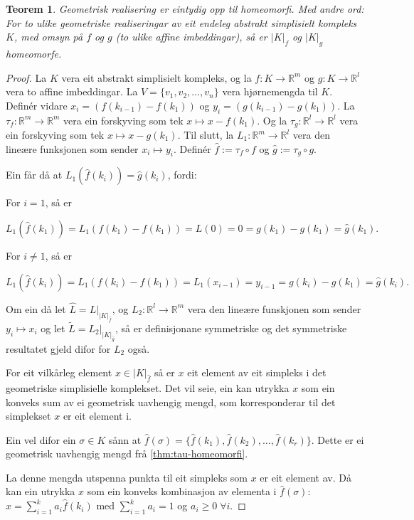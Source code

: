 \documentclass[a4paper, 12pt, norsk]{article}
\theoremstyle{plain}
\newtheorem{theorem}{Teorem}[section]
\theoremstyle{definition}
\newcommand{\Rb}{\mathbb{R}}
\newcommand{\gr}[1]{ \lvert #1 \rvert } %
\begin{document}
\begin{theorem} \label{thm:gr-eintydig} %
	Geometrisk realisering er eintydig opp til homeomorfi. Med andre ord: For to ulike geometriske realiseringar av eit endeleg abstrakt simplisielt kompleks $K$, med omsyn på $f$ og $g$ (to ulike affine imbeddingar), så er $\gr{K}_f$ og $\gr{K}_g$ homeomorfe.
\end{theorem}

\begin{proof}
	La $K$ vera eit abstrakt simplisielt kompleks, og la $f:K\to\Rb^m$ og $g:K\to\Rb^l$ vera to affine imbeddingar. La $V=\{ v_1, v_2, \dots, v_n \}$ vera hjørnemengda til $K$. Definér vidare $x_i=(f(k_{i-1})-f(k_1))$ og $y_i=(g(k_{i-1})-g(k_1))$. La $\tau_f:\Rb^m\to\Rb^m$ vera ein forskyving som tek $x\mapsto x-f(k_1)$. Og la $\tau_g:\Rb^l\to\Rb^l$ vera ein forskyving som tek $x\mapsto x-g(k_1)$. Til slutt, la $L_1:\Rb^m\to\Rb^l$ vera den lineære funksjonen som sender $x_i\mapsto y_i$. Definér $\hat{f}:=\tau_f\circ f$ og $\hat{g}:=\tau_g \circ g$.
	
	Ein får då at $L_1(\hat{f}(k_i))=\hat{g}(k_i)$, fordi:
	
	For $i=1$, så er

	\[
		L_1(\hat{f}(k_1))=L_1(f(k_1)-f(k_1))=L(0)=0=g(k_1)-g(k_1)=\hat{g}(k_1).
	\]

	For $i\neq 1$, så er

	\[
		L_1(\hat{f}(k_i))=L_1(f(k_i)-f(k_1))=L_1(x_{i-1})=y_{i-1}=g(k_i)-g(k_1)=\hat{g}(k_i).
	\]

	Om ein då let $\hat{L}=L|_{\gr{K}_{\hat{f}}}$, og $L_2:\Rb^l\to\Rb^m$ vera den lineære funskjonen som sender $y_i\mapsto x_i$ og let $\tilde{L}=L_2|_{\gr{K}_{\hat{g}}}$, så er definisjonane symmetriske og det symmetriske resultatet gjeld difor for $L_2$ også.

	For eit vilkårleg element $x\in\gr{K}_{\hat{f}}$ så er $x$ eit element av eit simpleks i det geometriske simplisielle komplekset. Det vil seie, ein kan utrykka $x$ som ein konveks sum av ei geometrisk uavhengig mengd, som korresponderar til det simplekset $x$ er eit element i.
	
	Ein vel difor ein $\sigma\in K$ sånn at $\hat{f}(\sigma)=\{\hat{f}(k_1), \hat{f}(k_2), \dots, \hat{f}(k_r)\}$. Dette er ei geometrisk uavhengig mengd frå \autoref{thm:tau-homeomorfi}.
	
	La denne mengda utspenna punkta til eit simpleks som $x$ er eit element av. Då kan ein utrykka $x$ som ein konveks kombinasjon av elementa i $\hat{f}(\sigma)$: $x=\sum_{i=1}^ka_i\hat{f}(k_i)$ med $\sum_{i=1}^ka_i=1$ og $a_i\geq0\; \forall i$. 
	

\end{proof}
\end{document}

